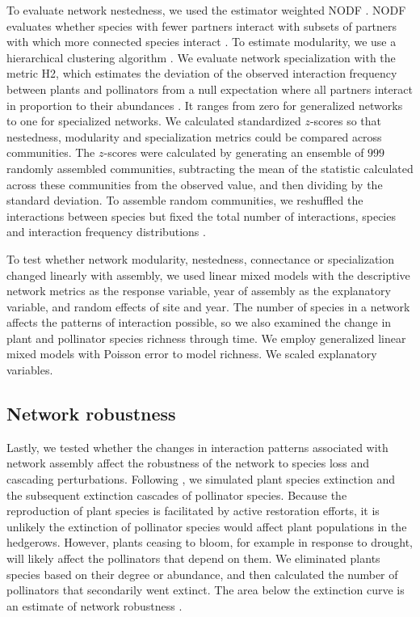 \documentclass[12pt]{article}
\begin{document}
To evaluate network nestedness, we used the estimator weighted NODF
\citep{almeida-neto-2008-1227}. NODF evaluates whether species with
fewer partners interact with subsets of partners with which more
connected species interact \citep{almeida-neto-2008-1227}. To estimate
modularity, we use a hierarchical clustering algorithm
\citep{Newman2004, csardi-2006}. We evaluate network specialization with
the metric H2, which estimates the deviation of the observed
interaction frequency between plants and pollinators from a null
expectation where all partners interact in proportion to their
abundances \citep{bluthgen-2006-9}. It ranges from zero for
generalized networks to one for specialized networks.  We calculated
standardized $z$-scores so that nestedness, modularity and
specialization metrics could be compared across communities. The
$z$-scores were calculated by generating an ensemble of $999$ randomly
assembled communities, subtracting the mean of the statistic
calculated across these communities from the observed value, and then
dividing by the standard deviation. To assemble random communities, we
reshuffled the interactions between species but fixed the total number
of interactions, species and interaction frequency distributions
\citep{Galeano2009}.

To test whether network modularity, nestedness, connectance or
specialization changed linearly with assembly, we used linear mixed
models with the descriptive network metrics as the response variable,
year of assembly as the explanatory variable, and random effects of
site and year. The number of species in a network affects the patterns
of interaction possible, so we also examined the change in plant and
pollinator species richness through time. We employ generalized linear
mixed models with Poisson error to model richness. We scaled
explanatory variables.


\subsection*{Network robustness}
Lastly, we tested whether the changes in interaction patterns
associated with network assembly affect the robustness of the network
to species loss and cascading perturbations. Following
\cite{Memmott2004}, we simulated plant species extinction and the
subsequent extinction cascades of pollinator species. Because the
reproduction of plant species is facilitated by active restoration
efforts, it is unlikely the extinction of pollinator species would
affect plant populations in the hedgerows. However, plants ceasing to
bloom, for example in response to drought, will likely affect the
pollinators that depend on them. We eliminated plants species based on
their degree or abundance, and then calculated the number of
pollinators that secondarily went extinct. The area below the
extinction curve is an estimate of network robustness
\citep{Memmott2004, bipartite}.
\end{document}

